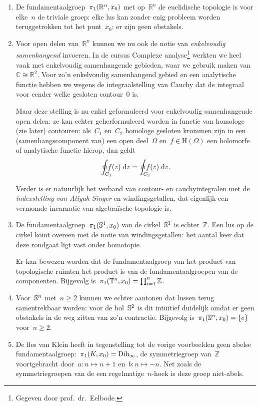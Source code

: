 \documentclass[a4paper,11pt,openany,oneside,article]{memoir}
\begin{document}
\begin{example}
  \begin{enumerate}
    \item De fundamentaalgroep~$\pi_1(\mathbb{R}^n,x_0)$ met op~$\mathbb{R}^n$ de euclidische topologie is voor elke~$n$ de triviale groep: elke lus kan zonder enig probleem worden teruggetrokken tot het punt~$x_0$: er zijn geen obstakels.

    \item Voor open delen van~$\mathbb{R}^n$ kunnen we nu ook de notie van \emph{enkelvoudig samenhangend} invoeren. In de cursus Complexe analyse\footnote{Gegeven door prof.~dr.~Eelbode.} werkten we heel vaak met enkelvoudig samenhangende gebieden, waar we gebruik maken van~$\mathbb{C}\cong\mathbb{R}^2$. Voor zo'n enkelvoudig samenhangend gebied en een analytische functie hebben we wegens de integraalstelling van Cauchy dat de integraal voor eender welke gesloten contour~$0$ is.

      Maar deze stelling is nu enkel geformuleerd voor enkelvoudig samenhangende open delen: ze kan echter geherformuleerd worden in functie van homologe (zie later) contouren: als~$C_1$ en~$C_2$ homologe gesloten krommen zijn in een (samenhangscomponent van) een open deel~$\Omega$ en~$f\in\mathrm{H}(\Omega)$ een holomorfe of analytische functie hierop, dan geldt
      \begin{equation}
        \oint_{\mathrlap{C_1}}\,f(z)\;\mathrm{d}z=\oint_{\mathrlap{C_2}}\,f(z)\;\mathrm{d}z.
      \end{equation}

      Verder is er natuurlijk het verband van contour- en cauchyintegralen met de \emph{indexstelling van Atiyah-Singer} en windingsgetallen, dat eigenlijk een vermomde incarnatie van algebra\"ische topologie is.

    \item De fundamentaalgroep~$\pi_1(\mathbb{S}^1,x_0)$ van de cirkel~$\mathbb{S}^1$ is echter~$\mathbb{Z}$. Een lus op de cirkel komt overeen met de notie van windingsgetallen: het aantal keer dat deze rondgaat ligt vast onder homotopie.

      Er kan bewezen worden dat de fundamentaalgroep van het product van topologische ruimten het product is van de fundamentaalgroepen van de componenten. Bijgevolg is~$\pi_1(\mathbb{T}^n,x_0)=\prod_{i=1}^n\mathbb{Z}$.

    \item Voor~$\mathbb{S}^n$ met~$n\geq 2$ kunnen we echter aantonen dat lussen terug samentrekbaar worden: voor de bol~$\mathbb{S}^2$ is dit intu\"itief duidelijk omdat er geen obstakels in de weg zitten van zo'n contractie. Bijgevolg is~$\pi_1(\mathbb{S}^n,x_0)=\left\{ e \right\}$ voor~$n\geq 2$.

    \item De fles van Klein heeft in tegenstelling tot de vorige voorbeelden geen abelse fundamentaalgroep:~$\pi_1(K,x_0)=\mathrm{Dih}_{\infty}$, de symmetriegroep van~$\mathbb{Z}$ voortgebracht door~$a\colon n\mapsto n+1$ en~$b\colon n\mapsto -n$. Net zoals de symmetriegroepen van de een regelmatige~$n$\nobreakdash-hoek is deze groep niet-abels. 
  \end{enumerate}
\end{example}
\end{document}
